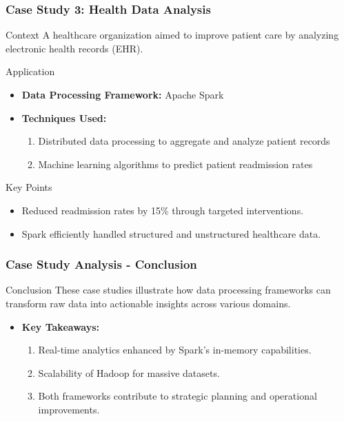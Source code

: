 \documentclass[aspectratio=169]{beamer}
\begin{document}
\begin{frame}[fragile]
    \frametitle{Case Study 3: Health Data Analysis}
    \begin{block}{Context}
        A healthcare organization aimed to improve patient care by analyzing electronic health records (EHR).
    \end{block}
    \begin{block}{Application}
        \begin{itemize}
            \item \textbf{Data Processing Framework:} Apache Spark
            \item \textbf{Techniques Used:}
            \begin{enumerate}
                \item Distributed data processing to aggregate and analyze patient records
                \item Machine learning algorithms to predict patient readmission rates
            \end{enumerate}
        \end{itemize}
    \end{block}
    \begin{block}{Key Points}
        \begin{itemize}
            \item Reduced readmission rates by 15\% through targeted interventions.
            \item Spark efficiently handled structured and unstructured healthcare data.
        \end{itemize}
    \end{block}
\end{frame}

\begin{frame}[fragile]
    \frametitle{Case Study Analysis - Conclusion}
    \begin{block}{Conclusion}
        These case studies illustrate how data processing frameworks can transform raw data into actionable insights across various domains.
    \end{block}
    \begin{itemize}
        \item \textbf{Key Takeaways:}
        \begin{enumerate}
            \item Real-time analytics enhanced by Spark's in-memory capabilities.
            \item Scalability of Hadoop for massive datasets.
            \item Both frameworks contribute to strategic planning and operational improvements.
        \end{enumerate}
    \end{itemize}
\end{frame}
\end{document}
